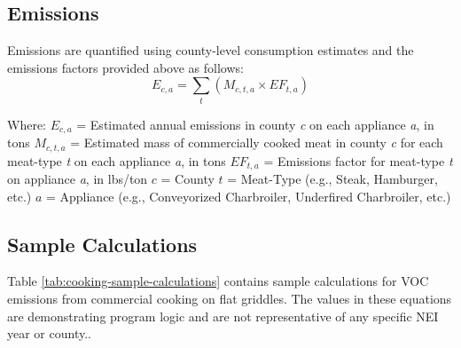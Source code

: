 \documentclass[
  11pt,
  oneside]{book}
\begin{document}
\subsection{Emissions}\label{emissions}

Emissions are quantified using county-level consumption estimates and the emissions factors provided above as follows:
\begin{equation} 
  E_{c,a} = \sum_{t}(M_{c,t,a} \times EF_{t,a})
  \label{eq:cooking-emissions}
\end{equation}

Where: \newline
\(E_{c,a}\) = Estimated annual emissions in county \emph{c} on each appliance \emph{a}, in tons \newline
\(M_{c,t,a}\) = Estimated mass of commercially cooked meat in county \emph{c} for each meat-type \emph{t} on each appliance \emph{a}, in tons \newline
\(EF_{t,a}\) = Emissions factor for meat-type \emph{t} on appliance \emph{a}, in lbs/ton \newline
\(c\) = County \newline
\(t\) = Meat-Type (e.g., Steak, Hamburger, etc.) \newline
\(a\) = Appliance (e.g., Conveyorized Charbroiler, Underfired Charbroiler, etc.) \newline

\subsection{Sample Calculations}\label{sample-calculations}

Table \ref{tab:cooking-sample-calculations} contains sample calculations for VOC emissions from commercial cooking on flat griddles. The values in these equations are demonstrating program logic and are not representative of any specific NEI year or county..
\end{document}
